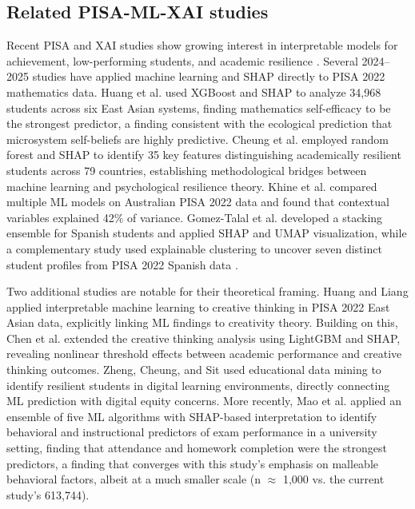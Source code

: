\documentclass[pdflatex,sn-mathphys-ay]{sn-jnl}
\begin{document}
\subsection{Related PISA-ML-XAI studies}

Recent PISA and XAI studies show growing interest in interpretable models for achievement, low-performing students, and academic resilience \citep{PISA_2018_XAI_math,PISA_2022_XAI_low_performers,PISA_2022_XAI_resilience}. Several 2024--2025 studies have applied machine learning and SHAP directly to PISA 2022 mathematics data. Huang et al. \citep{Huang_2024} used XGBoost and SHAP to analyze 34,968 students across six East Asian systems, finding mathematics self-efficacy to be the strongest predictor, a finding consistent with the ecological prediction that microsystem self-beliefs are highly predictive. Cheung et al. \citep{Cheung_2024_resilience} employed random forest and SHAP to identify 35 key features distinguishing academically resilient students across 79 countries, establishing methodological bridges between machine learning and psychological resilience theory. Khine et al. \citep{Khine_2024} compared multiple ML models on Australian PISA 2022 data and found that contextual variables explained 42\% of variance. Gomez-Talal et al. \citep{Gomez_Talal_2025} developed a stacking ensemble for Spanish students and applied SHAP and UMAP visualization, while a complementary study used explainable clustering to uncover seven distinct student profiles from PISA 2022 Spanish data \citep{Gomez_Talal_2024_clusters}.

Two additional studies are notable for their theoretical framing. Huang and Liang \citep{Huang_Liang_2025} applied interpretable machine learning to creative thinking in PISA 2022 East Asian data, explicitly linking ML findings to creativity theory. Building on this, Chen et al. \citep{Chen_2025_creative} extended the creative thinking analysis using LightGBM and SHAP, revealing nonlinear threshold effects between academic performance and creative thinking outcomes. Zheng, Cheung, and Sit \citep{Cheung_2024_digital} used educational data mining to identify resilient students in digital learning environments, directly connecting ML prediction with digital equity concerns. More recently, Mao et al. \citep{Mao_2025} applied an ensemble of five ML algorithms with SHAP-based interpretation to identify behavioral and instructional predictors of exam performance in a university setting, finding that attendance and homework completion were the strongest predictors, a finding that converges with this study's emphasis on malleable behavioral factors, albeit at a much smaller scale (n $\approx$ 1,000 vs. the current study's 613,744).
\end{document}
